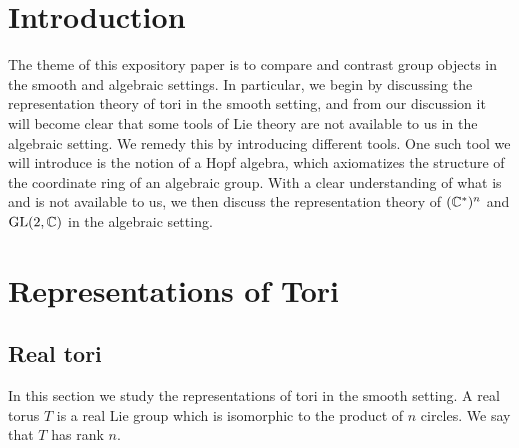 \documentclass{amsart}
\numberwithin{equation}{section}
\theoremstyle{plain} %
\theoremstyle{definition}
\theoremstyle{remark}
\begin{document}




\section{Introduction}
The theme of this expository paper is to compare and contrast group objects in the smooth and algebraic settings.
In particular, we begin by discussing the representation theory of tori in the smooth setting, and from our discussion
it will become clear that some tools of Lie theory are not available to us in the algebraic setting. We remedy this
by introducing different tools. One such tool we will introduce is the notion
of a Hopf algebra, which axiomatizes the structure of the coordinate ring of an 
algebraic group. With a clear understanding of what is and is not available to us,
we then discuss the representation theory of $(\mathbb{C}^*)^n$ and $\operatorname{GL}(2,\mathbb{C})$ in the algebraic setting.

\section{Representations of Tori}
\subsection{Real tori}
In this section we study the representations of tori in the smooth setting.
A real torus $T$ is a real Lie group which is isomorphic to the product of $n$ circles.
We say that $T$ has rank $n$.
\end{document}
